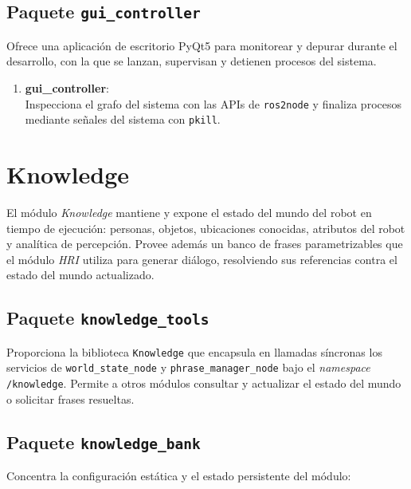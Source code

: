 \subsection{Paquete \texttt{gui\_controller}}
Ofrece una aplicación de escritorio PyQt5 para monitorear y depurar durante el desarrollo, con la que se lanzan, supervisan y detienen procesos del sistema.

\begin{enumerate}
    \item \textbf{gui\_controller}: \\
    Inspecciona el grafo del sistema con las APIs de \texttt{ros2node} y finaliza procesos mediante señales del sistema con \texttt{pkill}.
\end{enumerate}


\section[Knowledge]{Knowledge}
\label{app:justina_knowledge}

El módulo \textit{Knowledge} mantiene y expone el estado del mundo del robot en tiempo de ejecución: personas, objetos, ubicaciones conocidas, atributos del robot y analítica de percepción. Provee además un banco de frases parametrizables que el módulo \textit{HRI} utiliza para generar diálogo, resolviendo sus referencias contra el estado del mundo actualizado.

\subsection{Paquete \texttt{knowledge\_tools}}
Proporciona la biblioteca \texttt{Knowledge} que encapsula en llamadas síncronas los servicios de \texttt{world\_state\_node} y \texttt{phrase\_manager\_node} bajo el \textit{namespace} \texttt{/knowledge}. Permite a otros módulos consultar y actualizar el estado del mundo o solicitar frases resueltas.

\subsection{Paquete \texttt{knowledge\_bank}}
Concentra la configuración estática y el estado persistente del módulo:

